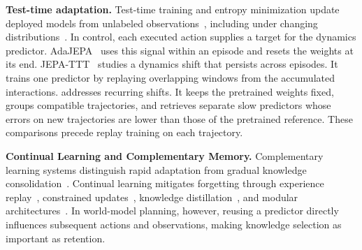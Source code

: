 \vspace{1mm}
\noindent \textbf{Test-time adaptation.}
Test-time training and entropy minimization update deployed models from unlabeled observations~\cite{sun2020ttt,wang2021tent}, including under changing distributions~\cite{wang2022cotta}. In control, each executed action supplies a target for the dynamics predictor. AdaJEPA~\cite{wang2026adajepa} uses this signal within an episode and resets the weights at its end. JEPA-TTT~\cite{zhang2026jepattt} studies a dynamics shift that persists across episodes. It trains one predictor by replaying overlapping windows from the accumulated interactions. \ours addresses recurring shifts. It keeps the pretrained weights fixed, groups compatible trajectories, and retrieves separate slow predictors whose errors on new trajectories are lower than those of the pretrained reference. These comparisons precede replay training on each trajectory.



\vspace{1mm}
\noindent\textbf{Continual Learning and Complementary Memory.}
Complementary learning systems distinguish rapid adaptation from gradual knowledge consolidation~\cite{mcclelland1995cls}.
Continual learning mitigates forgetting through experience replay~\cite{rolnick2019replay}, constrained updates~\cite{lopezpaz2017gem,kirkpatrick2017ewc}, knowledge distillation~\cite{li2016lwf}, and modular architectures~\cite{rusu2016progressive}.
In world-model planning, however, reusing a predictor directly influences subsequent actions and observations, making knowledge selection as important as retention.


